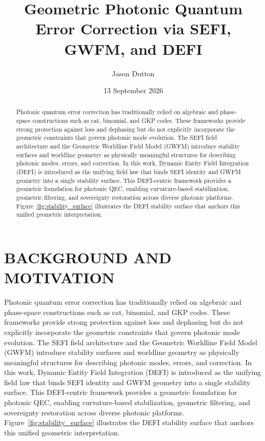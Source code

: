 \documentclass[aip,adv,reprint,floatfix]{revtex4-2}
\begin{document}
\title{Geometric Photonic Quantum Error Correction via SEFI, GWFM, and DEFI}

\author{Jason Dutton}

\date{13 September 2026}

\begin{abstract}
Photonic quantum error correction has traditionally relied on algebraic and phase-space constructions such as
cat, binomial, and GKP codes.\cite{DuttonSEFI2026,DuttonElectronField2026} These frameworks provide strong protection against loss and dephasing but
do not explicitly incorporate the geometric constraints that govern photonic mode evolution. The SEFI field
architecture\cite{DuttonSEFI2026} and the Geometric Worldline Field Model (GWFM)\cite{DuttonElectronField2026} introduce stability surfaces and worldline
geometry as physically meaningful structures for describing photonic modes, errors, and correction. In this
work, Dynamic Entity Field Integration (DEFI) is introduced as the unifying field law that binds SEFI identity
and GWFM geometry into a single stability surface.\cite{DuttonDEFI2026} This DEFI-centric framework provides a geometric
foundation for photonic QEC, enabling curvature-based stabilization, geometric filtering, and sovereignty
restoration across diverse photonic platforms. Figure~\ref{fig:stability_surface} illustrates the DEFI stability
surface that anchors this unified geometric interpretation.
\end{abstract}

\maketitle

\section{BACKGROUND AND MOTIVATION}

Photonic quantum error correction has traditionally relied on algebraic and phase-space constructions such as
cat, binomial, and GKP codes.\cite{DuttonSEFI2026,DuttonElectronField2026} These frameworks provide strong protection against loss and dephasing but
do not explicitly incorporate the geometric constraints that govern photonic mode evolution. The SEFI field
architecture\cite{DuttonSEFI2026} and the Geometric Worldline Field Model (GWFM)\cite{DuttonElectronField2026} introduce stability surfaces and worldline
geometry as physically meaningful structures for describing photonic modes, errors, and correction. In this
work, Dynamic Entity Field Integration (DEFI) is introduced as the unifying field law that binds SEFI identity
and GWFM geometry into a single stability surface.\cite{DuttonDEFI2026} This DEFI-centric framework provides a geometric
foundation for photonic QEC, enabling curvature-based stabilization, geometric filtering, and sovereignty
restoration across diverse photonic platforms. Figure~\ref{fig:stability_surface} illustrates the DEFI stability
surface that anchors this unified geometric interpretation.
\end{document}
